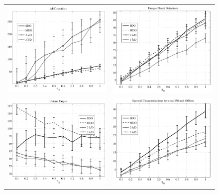  \begin{figure}[ht]
 \begin{center}
  \begin{tabular}{c c}
   \includegraphics[width=2.9in]{./figures/c4mSE_ADETs} &
   \includegraphics[width=2.9in]{./figures/c4mSE_AuDETs} \\
   \includegraphics[width=2.9in]{./figures/c4mSE_Auvisits} &
   \includegraphics[width=2.9in]{./figures/c4mSE_ASPECTRA}

\end{tabular}
\end{center}
\end{figure}
